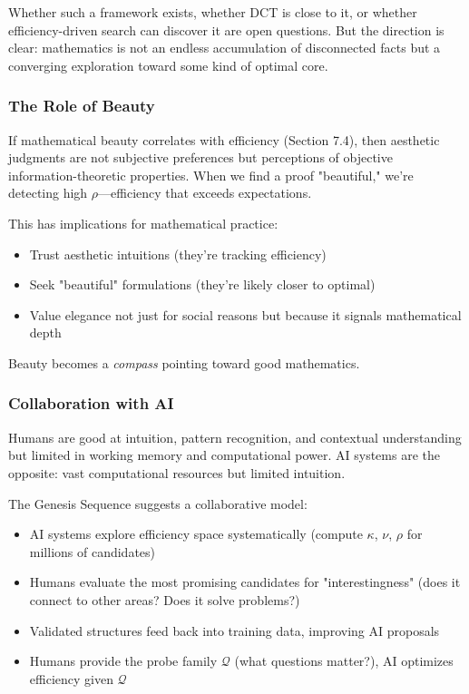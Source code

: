 \documentclass[11pt]{article}
\theoremstyle{definition}
\begin{document}
Whether such a framework exists, whether DCT is close to it, or whether efficiency-driven search can discover it are open questions. But the direction is clear: mathematics is not an endless accumulation of disconnected facts but a converging exploration toward some kind of optimal core.

\subsubsection{The Role of Beauty}

If mathematical beauty correlates with efficiency (Section 7.4), then aesthetic judgments are not subjective preferences but perceptions of objective information-theoretic properties. When we find a proof "beautiful," we're detecting high $\rho$—efficiency that exceeds expectations.

This has implications for mathematical practice:
\begin{itemize}
\item Trust aesthetic intuitions (they're tracking efficiency)
\item Seek "beautiful" formulations (they're likely closer to optimal)
\item Value elegance not just for social reasons but because it signals mathematical depth
\end{itemize}

Beauty becomes a \emph{compass} pointing toward good mathematics.

\subsubsection{Collaboration with AI}

Humans are good at intuition, pattern recognition, and contextual understanding but limited in working memory and computational power. AI systems are the opposite: vast computational resources but limited intuition.

The Genesis Sequence suggests a collaborative model:
\begin{itemize}
\item AI systems explore efficiency space systematically (compute $\kappa$, $\nu$, $\rho$ for millions of candidates)
\item Humans evaluate the most promising candidates for "interestingness" (does it connect to other areas? Does it solve problems?)
\item Validated structures feed back into training data, improving AI proposals
\item Humans provide the probe family $\mathcal{Q}$ (what questions matter?), AI optimizes efficiency given $\mathcal{Q}$
\end{itemize}
\end{document}
